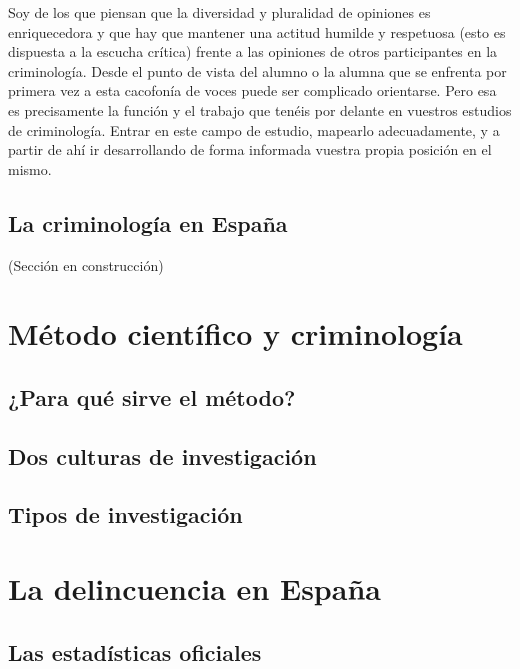 \documentclass[
  spanish,
  letterpaper,
  DIV=11,
  numbers=noendperiod]{scrreprt}
\begin{document}
Soy de los que piensan que la diversidad y pluralidad de opiniones es
enriquecedora y que hay que mantener una actitud humilde y respetuosa
(esto es dispuesta a la escucha crítica) frente a las opiniones de otros
participantes en la criminología. Desde el punto de vista del alumno o
la alumna que se enfrenta por primera vez a esta cacofonía de voces
puede ser complicado orientarse. Pero esa es precisamente la función y
el trabajo que tenéis por delante en vuestros estudios de criminología.
Entrar en este campo de estudio, mapearlo adecuadamente, y a partir de
ahí ir desarrollando de forma informada vuestra propia posición en el
mismo.

\section{La criminología en
España}\label{la-criminologuxeda-en-espauxf1a}

(Sección en construcción)

\chapter{Método científico y
criminología}\label{muxe9todo-cientuxedfico-y-criminologuxeda}

\section{¿Para qué sirve el
método?}\label{para-quuxe9-sirve-el-muxe9todo}

\section{Dos culturas de
investigación}\label{dos-culturas-de-investigaciuxf3n}

\section{Tipos de investigación}\label{tipos-de-investigaciuxf3n}

\chapter{La delincuencia en España}\label{la-delincuencia-en-espauxf1a}

\section{Las estadísticas
oficiales}\label{las-estaduxedsticas-oficiales}
\end{document}
